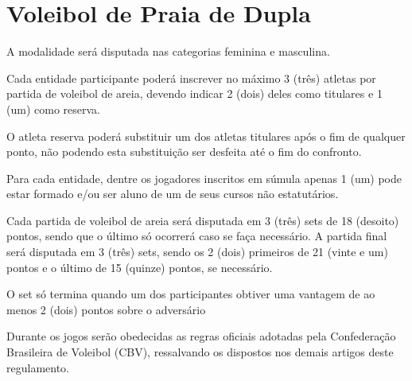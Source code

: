 {\let\clearpage\relax \chapter{Voleibol de Praia de Dupla}}

\begin{article}
	A modalidade será disputada nas categorias feminina e masculina.
\end{article}

\begin{article}
	Cada entidade participante poderá inscrever no máximo 3 (três) atletas por partida de voleibol de areia, devendo indicar 2 (dois) deles como titulares e 1 (um) como reserva.

	\begin{xparagraph}
		O atleta reserva poderá substituir um dos atletas titulares após o fim de qualquer ponto, não podendo esta substituição ser desfeita até o fim do confronto.
	\end{xparagraph}

	\begin{xparagraph}
	    Para cada entidade, dentre os jogadores inscritos em súmula apenas 1 (um) pode estar formado e/ou ser aluno de um de seus cursos não estatutários.
	\end{xparagraph}
\end{article}

\begin{article}
	Cada partida de voleibol de areia será disputada em 3 (três) sets de 18 (desoito) pontos, sendo que o último só ocorrerá caso se faça necessário. A partida final será disputada em 3 (três) sets, sendo os 2 (dois) primeiros de 21 (vinte e um) pontos e o último de 15 (quinze) pontos, se necessário.

	\begin{xparagraph}
		O set só termina quando um dos participantes obtiver uma vantagem de ao menos 2 (dois) pontos sobre o adversário
	\end{xparagraph}
\end{article}

\begin{article}
	Durante os jogos serão obedecidas as regras oficiais adotadas pela Confederação Brasileira de Voleibol (CBV), ressalvando os dispostos nos demais artigos deste regulamento.
\end{article}
